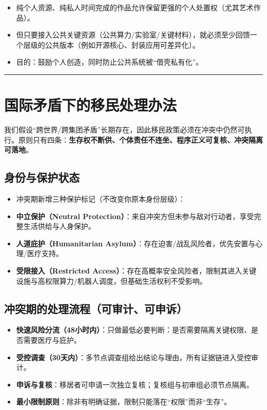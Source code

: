 \begin{itemize}
\item
  纯个人资源、纯私人时间完成的作品允许保留更强的个人处置权（尤其艺术作品）。
\item
  但只要接入公共关键资源（公共算力/实验室/关键材料），就必须至少回馈一个层级的公共版本（例如开源核心、封装应用可差异化）。
\item
  目的：鼓励个人创造，同时防止公共系统被``借壳私有化''。
\end{itemize}

\begin{center}\rule{0.5\linewidth}{0.5pt}\end{center}

\section{国际矛盾下的移民处理办法}\label{ux56fdux9645ux77dbux76feux4e0bux7684ux79fbux6c11ux5904ux7406ux529eux6cd5}

我们假设``跨世界/跨集团矛盾''长期存在，因此移民政策必须在冲突中仍然可执行。原则只有四条：\textbf{生存权不断供、个体责任不连坐、程序正义可复核、冲突隔离可落地}。

\subsection{身份与保护状态}\label{ux8eabux4efdux4e0eux4fddux62a4ux72b6ux6001}

\begin{itemize}
\item
  冲突期新增三种保护标记（不改变你原本身份层级）：
\item
  \textbf{中立保护（Neutral Protection）}：来自冲突方但未参与敌对行动者，享受完整生活供给与人身保护。
\item
  \textbf{人道庇护（Humanitarian Asylum）}：存在迫害/战乱风险者，优先安置与心理/医疗支持。
\item
  \textbf{受限接入（Restricted Access）}：存在高概率安全风险者，限制其进入关键设施与高权限算力/机器人调度，但基础生活权利不受影响。
\end{itemize}

\subsection{冲突期的处理流程（可审计、可申诉）}\label{ux51b2ux7a81ux671fux7684ux5904ux7406ux6d41ux7a0bux53efux5ba1ux8ba1ux53efux7533ux8bc9}

\begin{itemize}
\item
  \textbf{快速风险分流（48小时内）}：只做最低必要判断：是否需要隔离关键权限、是否需要医疗与庇护。
\item
  \textbf{受控调查（30天内）}：多节点调查组给出结论与理由，所有证据链进入受控审计。
\item
  \textbf{申诉与复核}：移居者可申请一次独立复核；复核组与初审组必须节点隔离。
\item
  \textbf{最小限制原则}：除非有明确证据，限制只能落在``权限''而非``生存''。
\end{itemize}

